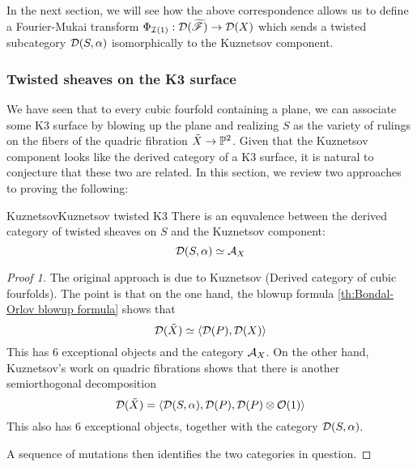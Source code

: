 In the next section, we will see how the above correspondence allows us to define a Fourier-Mukai transform $\Phi_{\calI(1)}: \calD (\tscrF)\rightarrow \calD (X)$ which sends a twisted subcategory $\calD(S,\alpha)$ isomorphically to the Kuznetsov component.

\subsubsection{Twisted sheaves on the K3 surface}

We have seen that to every cubic fourfold containing a plane, we can associate some K3 surface by blowing up the plane and realizing $S$ as the variety of rulings on the fibers of the quadric fibration $\tilde{X}\rightarrow \P^2$. Given that the Kuznetsov component looks like the derived category of a K3 surface, it is natural to conjecture that these two are related. In this section, we review two approaches to proving the following: 
\begin{proposition}{Kuznetsov}{Kuznetsov twisted K3}
    There is an equvalence between the derived category of twisted sheaves on $S$ and the Kuznetsov component: $$\calD(S,\alpha)\simeq \calA_X$$
\end{proposition}

\begin{proof}[Proof 1]
    The original approach is due to Kuznetsov (Derived category of cubic fourfolds). The point is that on the one hand, the blowup formula \ref{th:Bondal-Orlov blowup formula} shows that $$\calD(\tilde{X})\simeq \langle \calD(P), \calD(X)  \rangle $$
    This has $6$ exceptional objects and the category $\calA_X$.
    On the other hand, Kuznetsov's work on quadric fibrations shows that there is another semiorthogonal decomposition $$\calD(\tilde{X})=\langle \calD(S,\alpha), \calD(P), \calD(P) \otimes \O(1)\rangle$$
    This also has $6$ exceptional objects, together with the category $\calD(S,\alpha)$.

    A sequence of mutations then identifies the two categories in question.
\end{proof}

